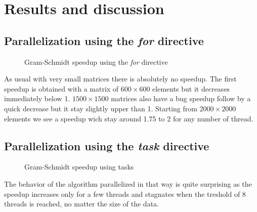 \chapter{Results and discussion}

\section{Parallelization using the \textit{for} directive}

\begin{figure}[ht]
  \begin{center}
  \end{center}
  \caption{Gram-Schmidt speedup using the \textit{for} directive}
  \label{fig:gram_speedup}
\end{figure} 

As usual with very small matrices there is absolutely no speedup. The first speedup is obtained with a matrix of $600\times 600$ elements but it decreases immediately below 1. $1500\times 1500$ matrices also have a bug speedup follow by a quick decrease but it stay slightly upper than 1.
Starting from $2000\times 2000$ elements we see a speedup wich stay around 1.75 to 2 for any number of thread.


\section{Parallelization using the \textit{task} directive}

\begin{figure}[ht]
  \begin{center}
  \end{center}
  \caption{Gram-Schmidt speedup using tasks}
  \label{fig:gram_speedup_task}
\end{figure} 

The behavior of the algorithm parallelized in that way is quite surprising as the speedup increases only for a few threads and stagnates when the treshold of 8 threads is reached, no matter the size of the data.\\

